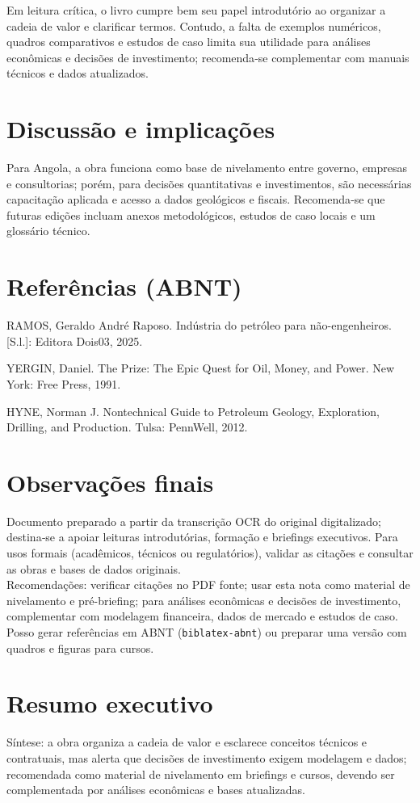 \documentclass[12pt,a4paper]{article}
\newcommand{\abntref}[1]{\par\hangindent=1.25cm #1\par}
\begin{document}
\noindent Em leitura crítica, o livro cumpre bem seu papel introdutório ao organizar a cadeia de valor e clarificar termos. Contudo, a falta de exemplos numéricos, quadros comparativos e estudos de caso limita sua utilidade para análises econômicas e decisões de investimento; recomenda‑se complementar com manuais técnicos e dados atualizados.

\section*{Discussão e implicações}
\noindent Para Angola, a obra funciona como base de nivelamento entre governo, empresas e consultorias; porém, para decisões quantitativas e investimentos, são necessárias capacitação aplicada e acesso a dados geológicos e fiscais. Recomenda‑se que futuras edições incluam anexos metodológicos, estudos de caso locais e um glossário técnico.

\section*{Referências (ABNT)}
\abntref{RAMOS, Geraldo André Raposo. Indústria do petróleo para não-engenheiros. [S.l.]: Editora Dois03, 2025.}
\abntref{YERGIN, Daniel. The Prize: The Epic Quest for Oil, Money, and Power. New York: Free Press, 1991.}
\abntref{HYNE, Norman J. Nontechnical Guide to Petroleum Geology, Exploration, Drilling, and Production. Tulsa: PennWell, 2012.}

\section*{Observações finais}
\noindent Documento preparado a partir da transcrição OCR do original digitalizado; destina‑se a apoiar leituras introdutórias, formação e briefings executivos. Para usos formais (acadêmicos, técnicos ou regulatórios), validar as citações e consultar as obras e bases de dados originais.\\
\noindent Recomendações: verificar citações no PDF fonte; usar esta nota como material de nivelamento e pré-briefing; para análises econômicas e decisões de investimento, complementar com modelagem financeira, dados de mercado e estudos de caso. Posso gerar referências em ABNT (\texttt{biblatex-abnt}) ou preparar uma versão com quadros e figuras para cursos.
\section*{Resumo executivo}
\noindent Síntese: a obra organiza a cadeia de valor e esclarece conceitos técnicos e contratuais, mas alerta que decisões de investimento exigem modelagem e dados; recomendada como material de nivelamento em briefings e cursos, devendo ser complementada por análises econômicas e bases atualizadas.
\end{document}
